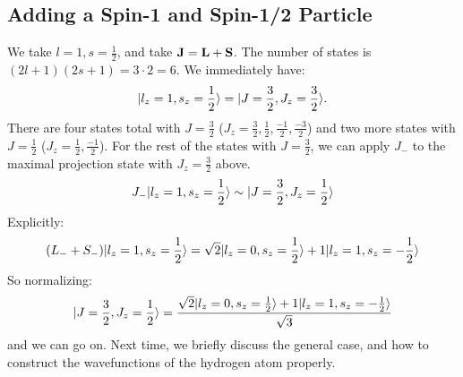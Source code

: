 \subsection{Adding a Spin-1 and Spin-1/2 Particle}
We take $l = 1, s = \frac{1}{2}$, and take $\mathbf{J} = \mathbf{L} + \mathbf{S}$. The number of states is $(2l + 1)(2s + 1) = 3\cdot 2 = 6$. We immediately have:
\begin{equation}
    \lvert l_z = 1, s_z = \frac{1}{2} \rangle = \lvert J = \frac{3}{2}, J_z = \frac{3}{2} \rangle.
\end{equation}
There are four states total with $J = \frac{3}{2}$ ($J_z = \frac{3}{2}, \frac{1}{2}, \frac{-1}{2}, \frac{-3}{2}$) and two more states with $J = \frac{1}{2}$ ($J_z = \frac{1}{2}, \frac{-1}{2}$). For the rest of the states with $J = \frac{3}{2}$, we can apply $J_-$ to the maximal projection state with $J_z = \frac{3}{2}$ above.
\begin{equation}
    J_-\lvert l_z = 1, s_z = \frac{1}{2} \rangle \sim \lvert J = \frac{3}{2}, J_z = \frac{1}{2} \rangle
\end{equation}
Explicitly:
\begin{equation}
    (L_- + S_-)\lvert l_z = 1, s_z = \frac{1}{2} \rangle = \sqrt{2}\lvert l_z = 0, s_z = \frac{1}{2} \rangle + 1\lvert l_z = 1, s_z = -\frac{1}{2} \rangle
\end{equation}
So normalizing:
\begin{equation}
    \lvert J = \frac{3}{2}, J_z = \frac{1}{2} \rangle = \frac{\sqrt{2}\lvert l_z = 0, s_z = \frac{1}{2} \rangle + 1\lvert l_z = 1, s_z = -\frac{1}{2} \rangle}{\sqrt{3}}
\end{equation}
and we can go on. Next time, we briefly discuss the general case, and how to construct the wavefunctions of the hydrogen atom properly.
